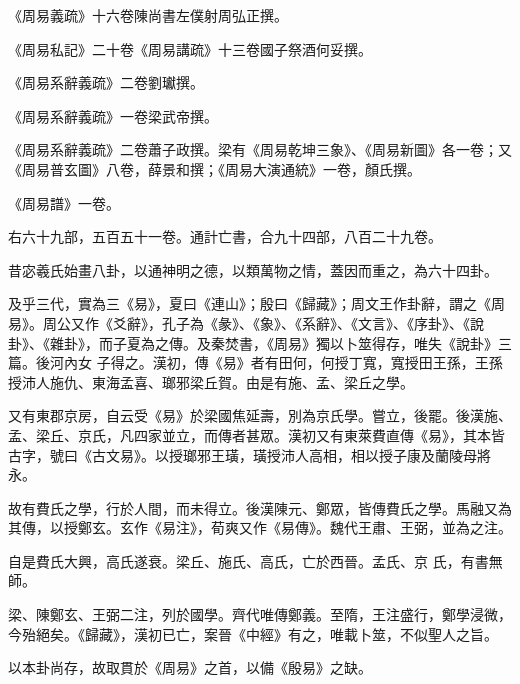 \begin{pinyinscope}
 《周易義疏》十六卷陳尚書左僕射周弘正撰。



 《周易私記》二十卷《周易講疏》十三卷國子祭酒何妥撰。



 《周易系辭義疏》二卷劉瓛撰。



 《周易系辭義疏》一卷梁武帝撰。



 《周易系辭義疏》二卷蕭子政撰。梁有《周易乾坤三象》、《周易新圖》各一卷；又《周易普玄圖》八卷，薛景和撰；《周易大演通統》一卷，顏氏撰。



 《周易譜》一卷。



 右六十九部，五百五十一卷。通計亡書，合九十四部，八百二十九卷。



 昔宓羲氏始畫八卦，以通神明之德，以類萬物之情，蓋因而重之，為六十四卦。



 及乎三代，實為三《易》，夏曰《連山》；殷曰《歸藏》；周文王作卦辭，謂之《周易》。周公又作《爻辭》，孔子為《彖》、《象》、《系辭》、《文言》、《序卦》、《說卦》、《雜卦》，而子夏為之傳。及秦焚書，《周易》獨以卜筮得存，唯失《說卦》三篇。後河內女
 子得之。漢初，傳《易》者有田何，何授丁寬，寬授田王孫，王孫授沛人施仇、東海孟喜、瑯邪梁丘賀。由是有施、孟、梁丘之學。



 又有東郡京房，自云受《易》於梁國焦延壽，別為京氏學。嘗立，後罷。後漢施、孟、梁丘、京氏，凡四家並立，而傳者甚眾。漢初又有東萊費直傳《易》，其本皆古字，號曰《古文易》。以授瑯邪王璜，璜授沛人高相，相以授子康及蘭陵母將永。



 故有費氏之學，行於人間，而未得立。後漢陳元、鄭眾，皆傳費氏之學。馬融又為其傳，以授鄭玄。玄作《易注》，荀爽又作《易傳》。魏代王肅、王弼，並為之注。



 自是費氏大興，高氏遂衰。梁丘、施氏、高氏，亡於西晉。孟氏、京
 氏，有書無師。



 梁、陳鄭玄、王弼二注，列於國學。齊代唯傳鄭義。至隋，王注盛行，鄭學浸微，今殆絕矣。《歸藏》，漢初已亡，案晉《中經》有之，唯載卜筮，不似聖人之旨。



 以本卦尚存，故取貫於《周易》之首，以備《殷易》之缺。




\end{pinyinscope}
